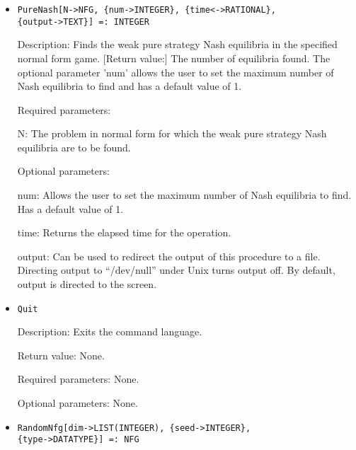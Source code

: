 \begin{itemize}
\item
\protect \large \begin{verbatim}
PureNash[N->NFG, {num->INTEGER}, {time<->RATIONAL},
{output->TEXT}] =: INTEGER
\end{verbatim}\normalsize

\bd
\item
[Description:] Finds the weak pure strategy Nash equilibria in the
specified normal form game.  [Return value:] The number of equilibria
found.  The optional parameter 'num' allows the user to set the
maximum number of Nash equilibria to find and has a default value of
1.
\item
[Required parameters:]\hfil\null
	
\bd
\item
[N:] The problem in normal form for which the weak pure strategy Nash
equilibria are to be found.
\ed

\item
[Optional parameters:]\hfil\null
	
\bd
\item
[num:] Allows the user to set the maximum number of Nash equilibria to
find.  Has a default value of 1.
\item
[time:] Returns the elapsed time for the operation.
\item
[output:] Can be used to redirect the output of this procedure to a
file.  Directing output to ``/dev/null'' under Unix turns output off.
By default, output is directed to the screen.

\ed
\ed

\item


\protect \large \begin{verbatim}
Quit
\end{verbatim}\normalsize

\bd

\item
[Description:] Exits the command language.
\item
[Return value:] None.
\item
[Required parameters:] None.
\item
[Optional parameters:] None.
\ed


\item

\protect \large \begin{verbatim}
RandomNfg[dim->LIST(INTEGER), {seed->INTEGER},
{type->DATATYPE}] =: NFG
\end{verbatim}\normalsize


\end{itemize}
